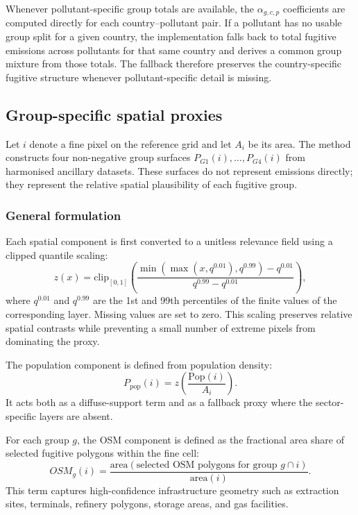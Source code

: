 Whenever pollutant-specific group totals are available, the
$\alpha_{g,c,p}$ coefficients are computed directly for each
country--pollutant pair. If a pollutant has no usable group split for a
given country, the implementation falls back to total fugitive
emissions across pollutants for that same country and derives a common
group mixture from those totals. The fallback therefore preserves the
country-specific fugitive structure whenever pollutant-specific detail is
missing.

\subsection{Group-specific spatial proxies}

Let $i$ denote a fine pixel on the reference grid and let $A_i$ be its
area. The method constructs four non-negative group surfaces
$P_{G1}(i),\ldots,P_{G4}(i)$ from harmonised ancillary datasets. These
surfaces do not represent emissions directly; they represent the
relative spatial plausibility of each fugitive group.

\subsubsection{General formulation}

Each spatial component is first converted to a unitless relevance field
using a clipped quantile scaling:
\begin{equation}
  z(x) =
  \mathrm{clip}_{[0,1]}
  \left(
    \frac{
      \min\!\left(\max(x, q^{0.01}), q^{0.99}\right) - q^{0.01}
    }{
      q^{0.99} - q^{0.01}
    }
  \right),
\end{equation}
where $q^{0.01}$ and $q^{0.99}$ are the 1st and 99th percentiles of the
finite values of the corresponding layer. Missing values are set to
zero. This scaling preserves relative spatial contrasts while preventing
a small number of extreme pixels from dominating the proxy.

The population component is defined from population density:
\begin{equation}
  P_{\mathrm{pop}}(i) =
  z\!\left(\frac{\mathrm{Pop}(i)}{A_i}\right).
\end{equation}
It acts both as a diffuse-support term and as a fallback proxy where the
sector-specific layers are absent.

For each group $g$, the OSM component is defined as the fractional area
share of selected fugitive polygons within the fine cell:
\begin{equation}
  OSM_g(i) =
  \frac{
    \mathrm{area}\!\left(
      \text{selected OSM polygons for group } g \cap i
    \right)
  }{
    \mathrm{area}(i)
  }.
\end{equation}
This term captures high-confidence infrastructure geometry such as
extraction sites, terminals, refinery polygons, storage areas, and gas
facilities.

